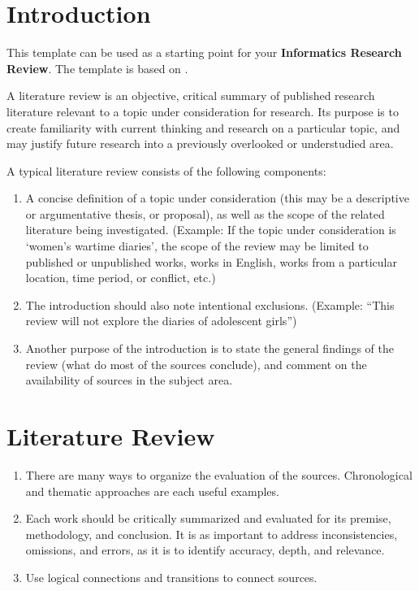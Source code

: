 \documentclass[a4paper,11pt]{article}
\begin{document}
\section{Introduction}

This template can be used as a starting point for your \textbf{Informatics Research Review}. The template is based on \cite{template}.

A literature review is an objective, critical summary of published research literature relevant to a topic under consideration for research. Its purpose is to create familiarity with current thinking and research on a particular topic, and may justify future research into a previously overlooked or understudied area.

A typical literature review consists of the following components:

\begin{enumerate}
    \item A concise definition of a topic under consideration (this may be a descriptive or argumentative thesis, or proposal), as well as the scope of the related literature being investigated. (Example: If the topic under consideration is `women's wartime diaries', the scope of the review may be limited to published or unpublished works, works in English, works from a particular location, time period, or conflict, etc.)
    \item The introduction should also note intentional exclusions. (Example: ``This review will not explore the diaries of adolescent girls'')
    \item Another purpose of the introduction is to state the general findings of the review (what do most of the sources conclude), and comment on the availability of sources in the subject area.
\end{enumerate}

\section{Literature Review}

\begin{enumerate}
    \item There are many ways to organize the evaluation of the sources. Chronological and thematic approaches are each useful examples.
    \item Each work should be critically summarized and evaluated for its premise, methodology, and conclusion. It is as important to address inconsistencies, omissions, and errors, as it is to identify accuracy, depth, and relevance.
    \item Use logical connections and transitions to connect sources.
\end{enumerate}
\end{document}
